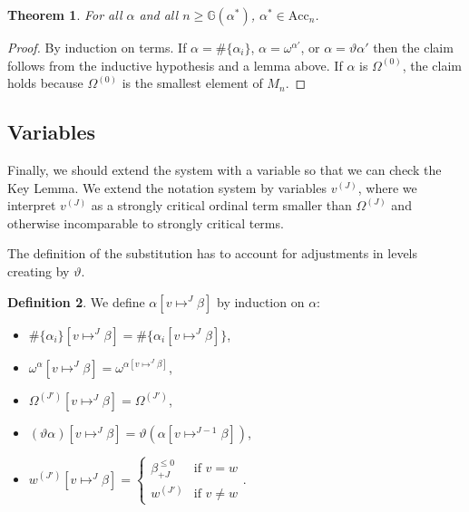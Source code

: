 \documentclass[11pt]{amsart}
\newtheorem{theorem}{Theorem}[section]
\theoremstyle{definition}
\newtheorem{definition}[theorem]{Definition}
\begin{document}
\begin{theorem}\label{thm:ordinals_wf_idOmega}
  For all $\alpha$ and all $n\geq \mathbb{G}(\alpha^*)$, $\alpha^*\in\mathrm{Acc}_n$.
\end{theorem}
\begin{proof}
  By induction on terms. If $\alpha=\#\{\alpha_i\}$, $\alpha=\omega^{\alpha'}$, or $\alpha=\vartheta\alpha'$ then the claim follows from the inductive hypothesis and a lemma above. If $\alpha$ is $\Omega^{(0)}$, the claim holds because $\Omega^{(0)}$ is the smallest element of $M_n$.
\end{proof}



\subsection{Variables}\label{sec:poly_variables}

Finally, we should extend the system with a variable so that we can check the Key Lemma. We extend the notation system by variables $v^{(J)}$, where we interpret $v^{(J)}$ as a strongly critical ordinal term smaller than $\Omega^{(J)}$ and otherwise incomparable to strongly critical terms.

The definition of the substitution has to account for adjustments in levels creating by $\vartheta$.
\begin{definition}
  We define $\alpha[v\mapsto^{J}\beta]$ by induction on $\alpha$:
  \begin{itemize}
  \item $\#\{\alpha_i\}[v\mapsto^{J}\beta]=\#\{\alpha_i[v\mapsto^{J}\beta]\}$,
  \item $\omega^\alpha[v\mapsto^{J}\beta]=\omega^{\alpha[v\mapsto^{J}\beta]}$,
  \item $\Omega^{(J')}[v\mapsto^{J}\beta]=\Omega^{(J')}$,
  \item $(\vartheta\alpha)[v\mapsto^{J}\beta]=\vartheta(\alpha[v\mapsto^{J-1}\beta])$,
  \item $w^{(J')}[v\mapsto^{J}\beta]=
    \left\{\begin{array}{ll}
             \beta^{\leq 0}_{+J}&\text{if }v=w\\
             w^{(J')}&\text{if }v\neq w
           \end{array}\right.$.
       \end{itemize}
\end{definition}
\end{document}
